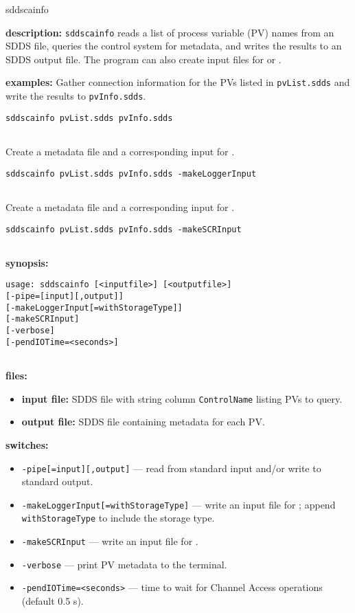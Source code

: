 %
%
\begin{sddsprog}{sddscainfo}
\item \textbf{description:}
  \verb+sddscainfo+ reads a list of process variable (PV) names from an SDDS file,
  queries the control system for metadata, and writes the results to an SDDS output file.
  The program can also create input files for  or .

\item \textbf{examples:}
  Gather connection information for the PVs listed in \verb+pvList.sdds+ and write the results to \verb+pvInfo.sdds+.
  \begin{verbatim}
sddscainfo pvList.sdds pvInfo.sdds
  
\end{verbatim}
  Create a metadata file and a corresponding input for .
  \begin{verbatim}
sddscainfo pvList.sdds pvInfo.sdds -makeLoggerInput
  
\end{verbatim}
  Create a metadata file and a corresponding input for .
  \begin{verbatim}
sddscainfo pvList.sdds pvInfo.sdds -makeSCRInput
  
\end{verbatim}

\item \textbf{synopsis:}
  \begin{verbatim}
usage: sddscainfo [<inputfile>] [<outputfile>]
[-pipe=[input][,output]]
[-makeLoggerInput[=withStorageType]]
[-makeSCRInput]
[-verbose]
[-pendIOTime=<seconds>]
  
\end{verbatim}

\item \textbf{files:}
\begin{itemize}
  \item \textbf{input file:} SDDS file with string column \verb|ControlName| listing PVs to query.
  \item \textbf{output file:} SDDS file containing metadata for each PV.
\end{itemize}

\item \textbf{switches:}
\begin{itemize}
  \item {\tt -pipe[=input][,output]} --- read from standard input and/or write to standard output.
  \item {\tt -makeLoggerInput[=withStorageType]} --- write an input file for ; append \verb|withStorageType| to include the storage type.
  \item {\tt -makeSCRInput} --- write an input file for .
  \item {\tt -verbose} --- print PV metadata to the terminal.
  \item {\tt -pendIOTime=<seconds>} --- time to wait for Channel Access operations (default 0.5 s).
\end{itemize}


\end{sddsprog}
